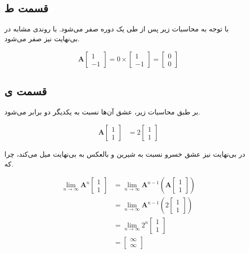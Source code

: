 \documentclass[14pt,a4]{article}
\begin{document}
\subsection*{قسمت ط}

با توجه به محاسبات زیر پس از طی یک دوره صفر می‌شود. با روندی مشابه در بی‌نهایت نیز صفر می‌شود.

\begin{align*}
     \boldsymbol{A} \begin{bmatrix}1 \\ -1\end{bmatrix} = 0 \times \begin{bmatrix}1 \\ -1\end{bmatrix} = \begin{bmatrix}0 \\ 0\end{bmatrix}
\end{align*}

\subsection*{قسمت ی}

بر طبق محاسبات زیر، عشق آن‌ها نسبت به یکدیگر دو برابر می‌شود.

\begin{align*}
    \boldsymbol{A}\begin{bmatrix}1 \\ 1\end{bmatrix} & = 2\begin{bmatrix}1 \\ 1\end{bmatrix}
\end{align*}

در بی‌نهایت نیز عشق خسرو نسبت به شیرین و بالعکس به بی‌نهایت میل می‌کند، چرا که.

\begin{align*}
    \lim_{n \to \infty} \boldsymbol{A}^n\begin{bmatrix}1 \\ 1\end{bmatrix} & =
    \lim_{n \to \infty} \boldsymbol{A}^{n-1} (\boldsymbol{A}\begin{bmatrix}1 \\ 1\end{bmatrix})\\
    & = \lim_{n \to \infty} \boldsymbol{A}^{n-1} (2\begin{bmatrix}1 \\ 1\end{bmatrix}) \\
    & = \lim_{n \to \infty} 2^n\begin{bmatrix}1 \\ 1\end{bmatrix} \\
    & = \begin{bmatrix}\infty \\ \infty\end{bmatrix} \\
\end{align*}
\end{document}
